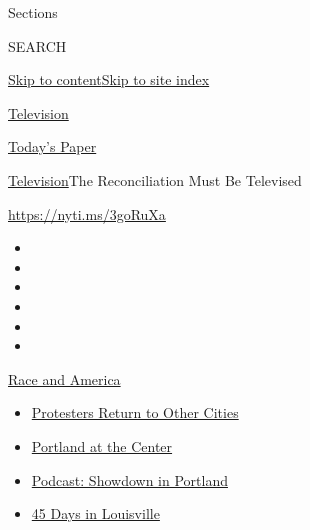 Sections

SEARCH

\protect\hyperlink{site-content}{Skip to
content}\protect\hyperlink{site-index}{Skip to site index}

\href{https://www.nytimes.com/section/arts/television}{Television}

\href{https://myaccount.nytimes.com/auth/login?response_type=cookie\&client_id=vi}{}

\href{https://www.nytimes.com/section/todayspaper}{Today's Paper}

\href{/section/arts/television}{Television}\textbar{}The Reconciliation
Must Be Televised

\url{https://nyti.ms/3goRuXa}

\begin{itemize}
\item
\item
\item
\item
\item
\item
\end{itemize}

\href{https://www.nytimes.com/news-event/george-floyd-protests-minneapolis-new-york-los-angeles?action=click\&pgtype=Article\&state=default\&region=TOP_BANNER\&context=storylines_menu}{Race
and America}

\begin{itemize}
\tightlist
\item
  \href{https://www.nytimes.com/2020/07/26/us/protests-portland-seattle-trump.html?action=click\&pgtype=Article\&state=default\&region=TOP_BANNER\&context=storylines_menu}{Protesters
  Return to Other Cities}
\item
  \href{https://www.nytimes.com/2020/07/24/us/portland-oregon-protests-white-race.html?action=click\&pgtype=Article\&state=default\&region=TOP_BANNER\&context=storylines_menu}{Portland
  at the Center}
\item
  \href{https://www.nytimes.com/2020/07/23/podcasts/the-daily/portland-protests.html?action=click\&pgtype=Article\&state=default\&region=TOP_BANNER\&context=storylines_menu}{Podcast:
  Showdown in Portland}
\item
  \href{https://www.nytimes.com/interactive/2020/07/16/us/black-lives-matter-protests-louisville-breonna-taylor.html?action=click\&pgtype=Article\&state=default\&region=TOP_BANNER\&context=storylines_menu}{45
  Days in Louisville}
\end{itemize}

